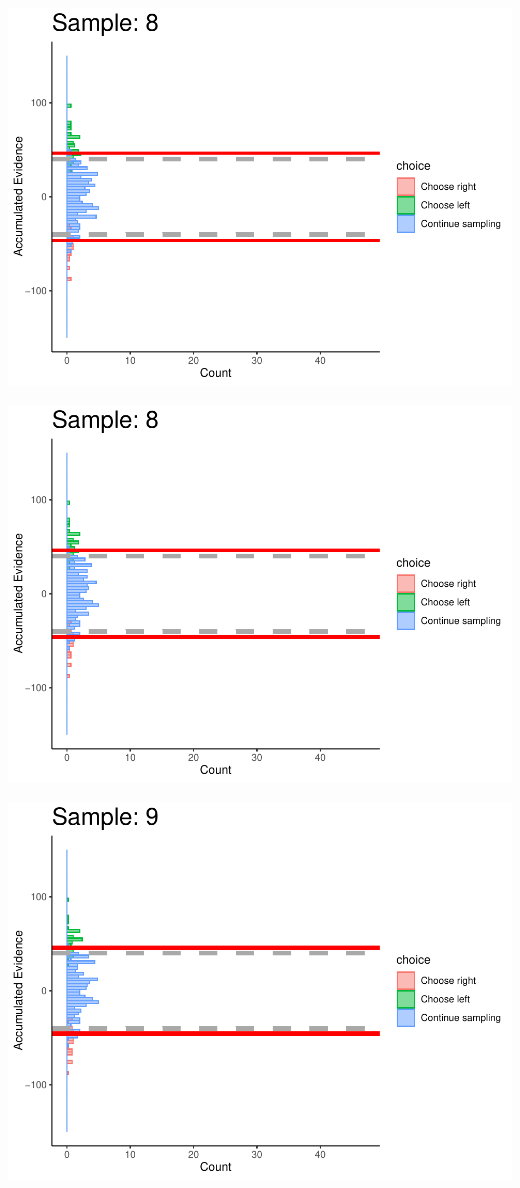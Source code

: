 \documentclass[
]{book}
\begin{document}
\begin{center}\includegraphics[width=0.8\linewidth]{LateNightBayes_files/figure-latex/collapsing_dcb-77} \end{center}

\begin{center}\includegraphics[width=0.8\linewidth]{LateNightBayes_files/figure-latex/collapsing_dcb-78} \end{center}

\begin{center}\includegraphics[width=0.8\linewidth]{LateNightBayes_files/figure-latex/collapsing_dcb-79} \end{center}
\end{document}
